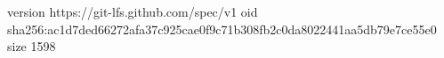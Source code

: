 version https://git-lfs.github.com/spec/v1
oid sha256:ac1d7ded66272afa37c925cae0f9c71b308fb2c0da8022441aa5db79e7ce55e0
size 1598
